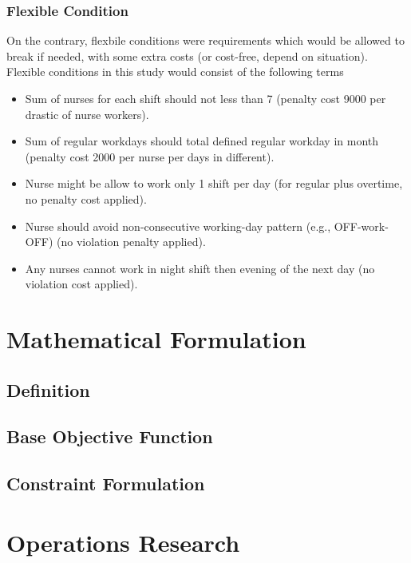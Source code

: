 \documentclass[conference]{IEEEtran}
\begin{document}
\subsubsection{Flexible Condition}
On the contrary, flexbile conditions were requirements which would be allowed to break if needed, with some extra costs (or cost-free, depend on situation). Flexible conditions in this study would consist of the following terms
\begin{itemize}
	\item Sum of nurses for each shift should not less than 7 (penalty cost 9000 per drastic of nurse workers).
	\item Sum of regular workdays should total defined regular workday in month (penalty cost 2000 per nurse per days in different).
	\item Nurse might be allow to work only 1 shift per day (for regular plus overtime, no penalty cost applied).
	\item Nurse should avoid non-consecutive working-day pattern (e.g., OFF-work-OFF) (no violation penalty applied).
	\item Any nurses cannot work in night shift then evening of the next day (no violation cost applied).
\end{itemize}

\section{Mathematical Formulation}

\subsection{Definition}
\subsection{Base Objective Function}
\subsection{Constraint Formulation}




\appendices

\section{Operations Research}
\end{document}

